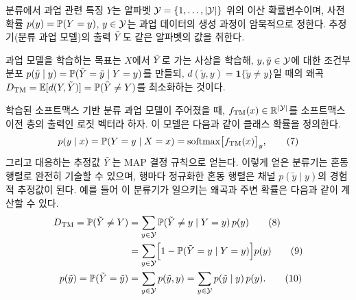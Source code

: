 분류에서 과업 관련 특징 $Y$는 알파벳 $\Ys=\{1,\dots,|\Ys|\}$ 위의 이산 확률변수이며, 사전 확률 $p(y)=\P(Y=y)$, $y\in\Ys$는 과업 데이터의 생성 과정이 암묵적으로 정한다. 추정기(분류 과업 모델)의 출력 $\Yt$도 같은 알파벳의 값을 취한다.

과업 모델을 학습하는 목표는 $X$에서 $\Yt$로 가는 사상을 학습해, $y,\tilde y\in\Ys$에 대한 조건부 분포 $p(\tilde y\mid y)=\P(\Yt=\tilde y\mid Y=y)$를 만들되, $d(\tilde y,y)=\mathbf 1\{\tilde y\ne y\}$일 때의 왜곡 $D_{\mathrm{TM}}=\E[d(Y,\Yt)]=\P(\Yt\ne Y)$를 최소화하는 것이다.

학습된 소프트맥스 기반 분류 과업 모델이 주어졌을 때, $f_{\mathrm{TM}}(x)\in\mathbb R^{|\Ys|}$를 소프트맥스 이전 층의 출력인 로짓 벡터라 하자. 이 모델은 다음과 같이 클래스 확률을 정의한다.
\begin{equation}
p(y\mid x)=\P(Y=y\mid X=x)=\mathrm{softmax}\bigl[f_{\mathrm{TM}}(x)\bigr]_y,\tag{7}
\end{equation}
그리고 대응하는 추정값 $\Yt$는 MAP 결정 규칙으로 얻는다. 이렇게 얻은 분류기는 혼동 행렬로 완전히 기술할 수 있으며, 행마다 정규화한 혼동 행렬은 채널 $p(\tilde y\mid y)$의 경험적 추정값이 된다. 예를 들어 이 분류기가 일으키는 왜곡과 주변 확률은 다음과 같이 계산할 수 있다.
\begin{align}
D_{\mathrm{TM}}=\P(\Yt\ne Y)&=\sum_{y\in\Ys}\P(\Yt\ne y\mid Y=y)\,p(y)\tag{8}\\
&=\sum_{y\in\Ys}\Bigl[1-\P(\Yt=y\mid Y=y)\Bigr]p(y)\tag{9}\\
p(\tilde y)=\P(\Yt=\tilde y)&=\sum_{y\in\Ys}p(\tilde y,y)=\sum_{y\in\Ys}p(\tilde y\mid y)\,p(y).\tag{10}
\end{align}

